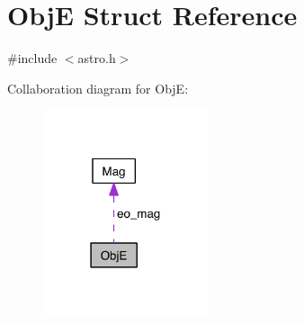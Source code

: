 \hypertarget{struct_obj_e}{\section{Obj\-E Struct Reference}
\label{struct_obj_e}
}


{\ttfamily \#include $<$astro.\-h$>$}



Collaboration diagram for Obj\-E\-:
\nopagebreak
\begin{figure}[H]
\begin{center}
\leavevmode
\includegraphics[width=138pt]{struct_obj_e__coll__graph}
\end{center}
\end{figure}
